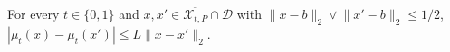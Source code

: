 For every \(t\in\{0,1\}\) and \(x,x'\in\overline{\mathcal X_{t,P}}\cap\mathcal D\) with \(\lVert x-b\rVert_2\vee\lVert x'-b\rVert_2\leq1/2\), \(|\mu_t(x)-\mu_t(x')|\leq L\lVert x-x'\rVert_2\).